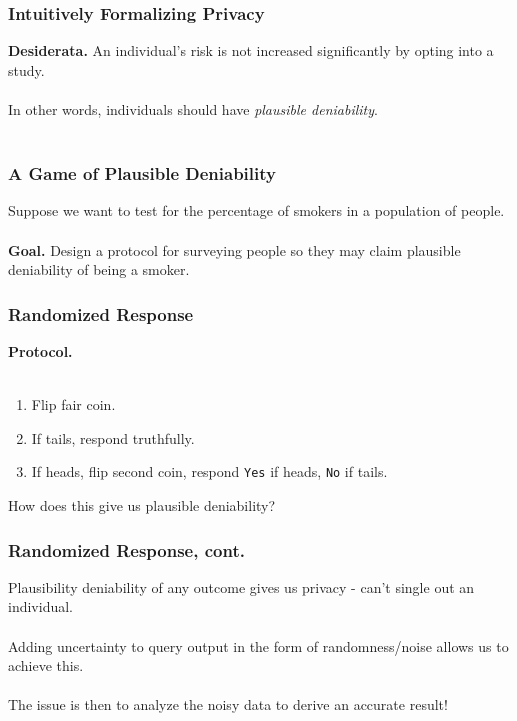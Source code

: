 \documentclass[aspectratio=169]{beamer}
\begin{document}
\begin{frame}
\frametitle{Intuitively Formalizing Privacy}

\textbf{Desiderata.} An individual's risk is not increased significantly by opting into a study.\\~\\

In other words, individuals should have \textit{plausible deniability}.\\~\\
\end{frame}

\begin{frame}
\frametitle{A Game of Plausible Deniability}
  Suppose we want to test for the percentage of smokers in a population of people.\\~\\

  \textbf{Goal.} Design a protocol for surveying people so they may claim plausible deniability of being a smoker.
\end{frame}

\begin{frame}
\frametitle{Randomized Response}
\textbf{Protocol.}\\~\\
\begin{enumerate}
  \item Flip fair coin.
  \item If tails, respond truthfully.
  \item If heads, flip second coin, respond \texttt{Yes} if heads, \texttt{No} if tails.
\end{enumerate}

How does this give us plausible deniability?
\end{frame}

\begin{frame}
\frametitle{Randomized Response, cont.}
  Plausibility deniability of any outcome gives us privacy - can't single out an individual. \\~\\

  Adding uncertainty to query output in the form of randomness/noise allows us to achieve this.\\~\\

  The issue is then to analyze the noisy data to derive an accurate result!

\end{frame}
\end{document}
